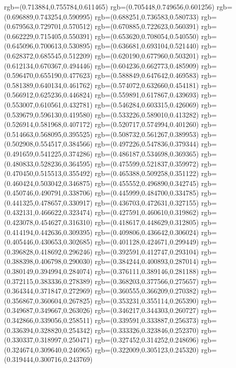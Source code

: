 {{{			rgb=(0.713884,0.755784,0.611465)
			rgb=(0.705448,0.749656,0.601256)
			rgb=(0.696889,0.743254,0.590995)
			rgb=(0.688251,0.736583,0.580733)
			rgb=(0.679563,0.729701,0.570512)
			rgb=(0.670885,0.722623,0.560391)
			rgb=(0.662229,0.715405,0.550391)
			rgb=(0.653620,0.708054,0.540550)
			rgb=(0.645096,0.700613,0.530895)
			rgb=(0.636681,0.693104,0.521440)
			rgb=(0.628372,0.685545,0.512209)
			rgb=(0.620190,0.677960,0.503201)
			rgb=(0.612134,0.670367,0.494446)
			rgb=(0.604236,0.662773,0.485909)
			rgb=(0.596470,0.655190,0.477623)
			rgb=(0.588849,0.647642,0.469583)
			rgb=(0.581389,0.640134,0.461762)
			rgb=(0.574072,0.632660,0.454181)
			rgb=(0.566912,0.625236,0.446824)
			rgb=(0.559891,0.617867,0.439693)
			rgb=(0.553007,0.610561,0.432781)
			rgb=(0.546284,0.603315,0.426069)
			rgb=(0.539679,0.596130,0.419580)
			rgb=(0.533226,0.589010,0.413282)
			rgb=(0.526914,0.581968,0.407172)
			rgb=(0.520717,0.574994,0.401260)
			rgb=(0.514663,0.568095,0.395525)
			rgb=(0.508732,0.561267,0.389953)
			rgb=(0.502908,0.554517,0.384566)
			rgb=(0.497226,0.547836,0.379344)
			rgb=(0.491659,0.541225,0.374286)
			rgb=(0.486187,0.534698,0.369365)
			rgb=(0.480833,0.528236,0.364595)
			rgb=(0.475599,0.521837,0.359972)
			rgb=(0.470450,0.515513,0.355492)
			rgb=(0.465388,0.509258,0.351122)
			rgb=(0.460424,0.503042,0.346875)
			rgb=(0.455552,0.496890,0.342745)
			rgb=(0.450746,0.490791,0.338706)
			rgb=(0.445999,0.484700,0.334785)
			rgb=(0.441325,0.478657,0.330917)
			rgb=(0.436703,0.472631,0.327155)
			rgb=(0.432131,0.466622,0.323474)
			rgb=(0.427591,0.460610,0.319862)
			rgb=(0.423078,0.454627,0.316310)
			rgb=(0.418617,0.448629,0.312805)
			rgb=(0.414194,0.442636,0.309395)
			rgb=(0.409806,0.436642,0.306024)
			rgb=(0.405446,0.430653,0.302685)
			rgb=(0.401128,0.424671,0.299449)
			rgb=(0.396828,0.418692,0.296246)
			rgb=(0.392591,0.412747,0.293104)
			rgb=(0.388398,0.406798,0.290030)
			rgb=(0.384244,0.400893,0.287014)
			rgb=(0.380149,0.394994,0.284074)
			rgb=(0.376111,0.389146,0.281188)
			rgb=(0.372115,0.383336,0.278389)
			rgb=(0.368203,0.377566,0.275657)
			rgb=(0.364344,0.371847,0.272969)
			rgb=(0.360555,0.366209,0.270382)
			rgb=(0.356867,0.360604,0.267825)
			rgb=(0.353231,0.355114,0.265390)
			rgb=(0.349687,0.349667,0.263026)
			rgb=(0.346217,0.344303,0.260727)
			rgb=(0.342866,0.339056,0.258511)
			rgb=(0.339591,0.333887,0.256373)
			rgb=(0.336394,0.328820,0.254342)
			rgb=(0.333326,0.323846,0.252370)
			rgb=(0.330337,0.318997,0.250471)
			rgb=(0.327452,0.314252,0.248696)
			rgb=(0.324674,0.309640,0.246965)
			rgb=(0.322009,0.305123,0.245320)
			rgb=(0.319444,0.300716,0.243769)
}}}

